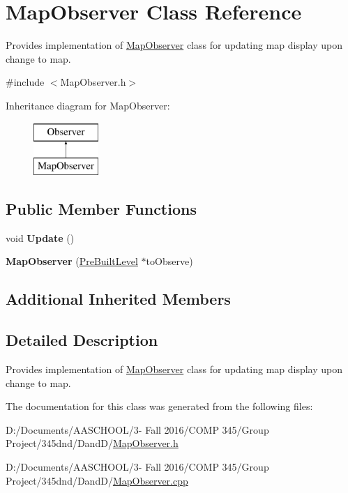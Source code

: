 \hypertarget{class_map_observer}{}\section{Map\+Observer Class Reference}
\label{class_map_observer}


Provides implementation of \hyperlink{class_map_observer}{Map\+Observer} class for updating map display upon change to map.  




{\ttfamily \#include $<$Map\+Observer.\+h$>$}

Inheritance diagram for Map\+Observer\+:\begin{figure}[H]
\begin{center}
\leavevmode
\includegraphics[height=2.000000cm]{class_map_observer}
\end{center}
\end{figure}
\subsection*{Public Member Functions}
\begin{DoxyCompactItemize}
\item 
\hypertarget{class_map_observer_aeea0273b48610e4e76b280946aab7723}{}\label{class_map_observer_aeea0273b48610e4e76b280946aab7723} 
void {\bfseries Update} ()
\item 
\hypertarget{class_map_observer_a9c75d62198d7fd0b63137f9f18dd3975}{}\label{class_map_observer_a9c75d62198d7fd0b63137f9f18dd3975} 
{\bfseries Map\+Observer} (\hyperlink{class_pre_built_level}{Pre\+Built\+Level} $\ast$to\+Observe)
\end{DoxyCompactItemize}
\subsection*{Additional Inherited Members}


\subsection{Detailed Description}
Provides implementation of \hyperlink{class_map_observer}{Map\+Observer} class for updating map display upon change to map. 

The documentation for this class was generated from the following files\+:\begin{DoxyCompactItemize}
\item 
D\+:/\+Documents/\+A\+A\+S\+C\+H\+O\+O\+L/3-\/ Fall 2016/\+C\+O\+M\+P 345/\+Group Project/345dnd/\+Dand\+D/\hyperlink{_map_observer_8h}{Map\+Observer.\+h}\item 
D\+:/\+Documents/\+A\+A\+S\+C\+H\+O\+O\+L/3-\/ Fall 2016/\+C\+O\+M\+P 345/\+Group Project/345dnd/\+Dand\+D/\hyperlink{_map_observer_8cpp}{Map\+Observer.\+cpp}\end{DoxyCompactItemize}
